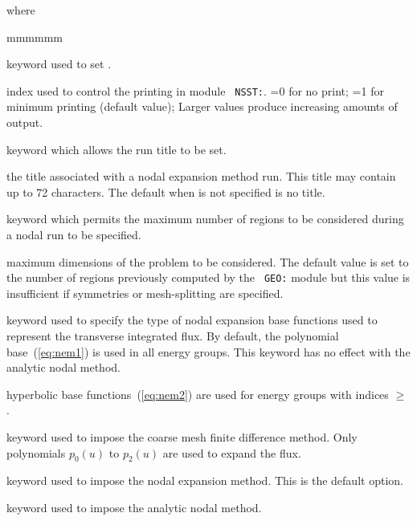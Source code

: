 \noindent where
\begin{ListeDeDescription}{mmmmmm}

\item[\moc{EDIT}] keyword used to set .

\item[\dusa{iprint}] index used to control the printing  in module {\tt
NSST:}. =0 for no print; =1 for minimum printing (default value); Larger
values produce increasing amounts of output.

\item[\moc{TITL}] keyword which allows the run title to be set.

\item[\dusa{TITLE}] the title associated with a nodal expansion method run. This
title may contain up to 72 characters. The default when  is not specified is no title.

\item[\moc{MAXR}] keyword which permits the maximum number of regions to be considered during a nodal run to be specified.

\item[\dusa{maxpts}] maximum dimensions of the problem to be considered.  The
default value is set to the number of regions previously computed by the {\tt
GEO:} module but this value is insufficient if symmetries or mesh-splitting
are specified.

\item[\moc{HYPE}] keyword used to specify the type of nodal expansion base functions used to represent the transverse integrated flux.
By default, the polynomial base~(\ref{eq:nem1}) is used in all energy groups. This keyword has no effect with the analytic nodal method.

\item[\dusa{igmax}] hyperbolic base functions~(\ref{eq:nem2}) are used for energy groups with indices $\ge$ .

\item[\moc{CMFD}] keyword used to impose the coarse mesh finite difference method. Only polynomials $p_0(u)$ to $p_2(u)$ are used to expand the flux.

\item[\moc{NEM}] keyword used to impose the nodal expansion method. This is the default option.

\item[\moc{ANM}] keyword used to impose the analytic nodal method.

\end{ListeDeDescription}

